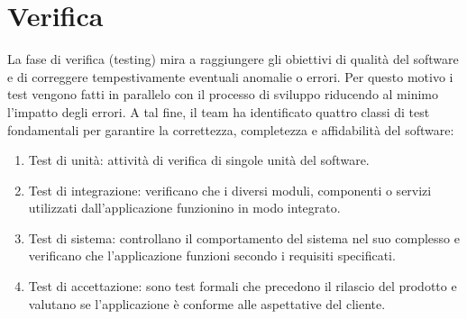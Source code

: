 \newpage
\section{Verifica}
\label{sec:verifica}
La fase di verifica (testing) mira a raggiungere gli obiettivi di qualità del software e di correggere tempestivamente 
eventuali anomalie o errori. Per questo motivo i test vengono fatti in parallelo con il processo di sviluppo riducendo 
al minimo l'impatto degli errori. A tal fine, il team ha identificato quattro classi di test fondamentali per garantire 
la correttezza, completezza e affidabilità del software:
\begin{enumerate}
    \item Test di unità: attività di verifica di singole unità del software.
    \item Test di integrazione: verificano che i diversi moduli, componenti o servizi utilizzati dall'applicazione 
    funzionino in modo integrato.
    \item Test di sistema: controllano il comportamento del sistema nel suo complesso e verificano che l'applicazione 
    funzioni secondo i requisiti specificati.
    \item Test di accettazione: sono test formali che precedono il rilascio del prodotto e valutano se l'applicazione 
    è conforme alle aspettative del cliente.
    
\end{enumerate}






